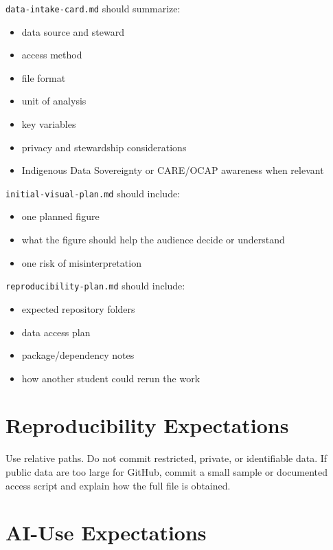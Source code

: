 \documentclass[
  letterpaper,
  DIV=11,
  numbers=noendperiod,
  oneside]{scrreprt}
\providecommand{\tightlist}{%
  \setlength{\itemsep}{0pt}\setlength{\parskip}{0pt}}
\begin{document}
\texttt{data-intake-card.md} should summarize:

\begin{itemize}
\tightlist
\item
  data source and steward
\item
  access method
\item
  file format
\item
  unit of analysis
\item
  key variables
\item
  privacy and stewardship considerations
\item
  Indigenous Data Sovereignty or CARE/OCAP awareness when relevant
\end{itemize}

\texttt{initial-visual-plan.md} should include:

\begin{itemize}
\tightlist
\item
  one planned figure
\item
  what the figure should help the audience decide or understand
\item
  one risk of misinterpretation
\end{itemize}

\texttt{reproducibility-plan.md} should include:

\begin{itemize}
\tightlist
\item
  expected repository folders
\item
  data access plan
\item
  package/dependency notes
\item
  how another student could rerun the work
\end{itemize}

\section{Reproducibility
Expectations}\label{reproducibility-expectations-3}

Use relative paths. Do not commit restricted, private, or identifiable
data. If public data are too large for GitHub, commit a small sample or
documented access script and explain how the full file is obtained.

\section{AI-Use Expectations}\label{ai-use-expectations-2}
\end{document}
